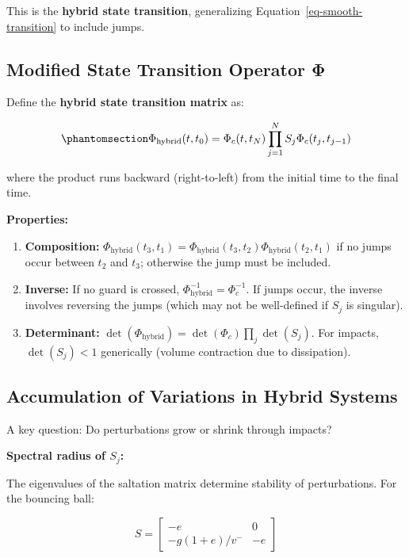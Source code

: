 \documentclass[
  letterpaper,
  DIV=11,
  numbers=noendperiod]{scrartcl}
\begin{document}
This is the \textbf{hybrid state transition}, generalizing
Equation~\ref{eq-smooth-transition} to include jumps.

\subsection{Modified State Transition Operator
Φ}\label{modified-state-transition-operator-ux3c6}

Define the \textbf{hybrid state transition matrix} as:

\begin{equation}\phantomsection\label{eq-hybrid-stm-operator}{
\Phi_{\text{hybrid}}(t, t_0) = \Phi_c(t, t_N) \prod_{j=1}^{N} S_j \Phi_c(t_j, t_{j-1})
}\end{equation}

where the product runs backward (right-to-left) from the initial time to
the final time.

\textbf{Properties:}

\begin{enumerate}
\def\labelenumi{\arabic{enumi}.}
\item
  \textbf{Composition:}
  \(\Phi_{\text{hybrid}}(t_3, t_1) = \Phi_{\text{hybrid}}(t_3, t_2) \Phi_{\text{hybrid}}(t_2, t_1)\)
  if no jumps occur between \(t_2\) and \(t_3\); otherwise the jump must
  be included.
\item
  \textbf{Inverse:} If no guard is crossed,
  \(\Phi_{\text{hybrid}}^{-1} = \Phi_c^{-1}\). If jumps occur, the
  inverse involves reversing the jumps (which may not be well-defined if
  \(S_j\) is singular).
\item
  \textbf{Determinant:}
  \(\det(\Phi_{\text{hybrid}}) = \det(\Phi_c) \prod_j \det(S_j)\). For
  impacts, \(\det(S_j) < 1\) generically (volume contraction due to
  dissipation).
\end{enumerate}

\subsection{Accumulation of Variations in Hybrid
Systems}\label{accumulation-of-variations-in-hybrid-systems}

A key question: Do perturbations grow or shrink through impacts?

\textbf{Spectral radius of \(S_j\):}

The eigenvalues of the saltation matrix determine stability of
perturbations. For the bouncing ball:

\[
S = \begin{bmatrix} -e & 0 \\ -g(1+e)/v^- & -e \end{bmatrix}
\]
\end{document}

